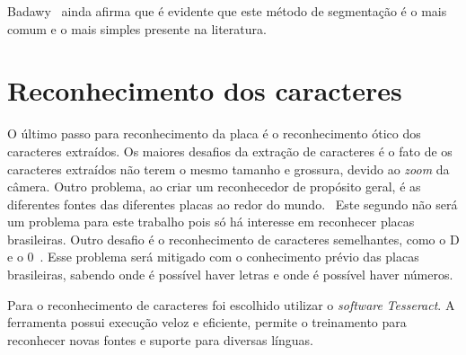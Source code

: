 Badawy~\cite{s2013automatic} ainda afirma que é evidente que este método de
segmentação é o mais comum e o mais simples presente na literatura.

\section{Reconhecimento dos caracteres} \label{sec:reconhecimento}

O último passo para reconhecimento da placa é o reconhecimento ótico dos
caracteres extraídos. Os maiores desafios da extração de caracteres é o fato de
os caracteres extraídos não terem o mesmo tamanho e grossura, devido ao
\emph{zoom} da câmera. Outro problema, ao criar um reconhecedor de propósito
geral, é as diferentes fontes das diferentes placas ao redor do mundo.~\cite{s2013automatic}
Este segundo não será um problema para este trabalho pois
só há interesse em reconhecer placas brasileiras. Outro desafio é o
reconhecimento de caracteres semelhantes, como o D e o
0~\cite{ho2016intelligent}.  Esse problema será mitigado com o conhecimento
prévio das placas brasileiras, sabendo onde é possível haver letras e onde é
possível haver números.

Para o reconhecimento de caracteres foi escolhido utilizar o \emph{software}
\emph{Tesseract}. A ferramenta possui execução veloz e eficiente, permite o
treinamento para reconhecer novas fontes e suporte para diversas línguas.
